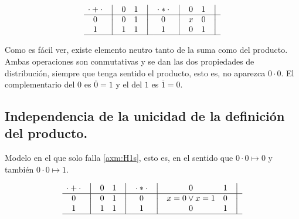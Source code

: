 \documentclass[final,12pt,a4paper,twoside,fleqn]{extbook}
\theoremstyle{definition}
\theoremstyle{remark}
\begin{document}
\[
    \begin{matrix}
        {\cdot + \cdot} & \big{\vert} & {0} & {1} & \big{\vert} \\
        \hline
        {0}             & \big{\vert} & {0} & {1} & \big{\vert} \\
        {1}             & \big{\vert} & {1} & {1} & \big{\vert} \\
        \hline
    \end{matrix}
    \quad
    \begin{matrix}
        {\cdot * \cdot} & \big{\vert} & {0} & {1} & \big{\vert} \\
        \hline
        {0}                   & \big{\vert} & {x} & {0} & \big{\vert} \\
        {1}                   & \big{\vert} & {0} & {1} & \big{\vert} \\
        \hline
    \end{matrix}
\]



	Como es fácil ver, existe elemento neutro tanto de la suma como del
producto. Ambas operaciones son conmutativas y se dan las dos propiedades de
distribución, siempre que tenga sentido el producto, esto es, no aparezca \(0 \cdot 0\). El complementario del \(0\) es \(\overline 0 = 1\) y el del
\(1\) es \(\overline 1 = 0\).



\subsection{Independencia de la unicidad de la definición del producto.}



Modelo en el que solo falla \ref{axm:H1s}, esto es, en el sentido que \(0
\cdot 0 \mapsto 0\) y también \(0 \cdot 0 \mapsto 1\).



\[
    \begin{matrix}
        {\cdot + \cdot} & \big{\vert} & {0} & {1} & \big{\vert} \\
        \hline
        {0}             & \big{\vert} & {0} & {1} & \big{\vert} \\
        {1}             & \big{\vert} & {1} & {1} & \big{\vert} \\
        \hline
    \end{matrix}
    \quad
    \begin{matrix}
        {\cdot * \cdot} & \big{\vert} & {0} & {1} & \big{\vert} \\
        \hline
        {0}                   & \big{\vert} & {x=0 \vee x=1} & {0} & \big{\vert} \\
        {1}                   & \big{\vert} & {0} & {1} & \big{\vert} \\
        \hline
    \end{matrix}
\]
\end{document}
